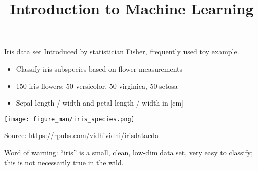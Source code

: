 \documentclass[11pt,compress,t,notes=noshow, xcolor=table]{beamer}
\title{Introduction to Machine Learning}
\begin{document}



\begin{vbframe}{Iris data set}
Introduced by statistician Fisher,  frequently used toy example.
\begin{itemize}
\item Classify iris subspecies based on flower measurements
\item 150 iris flowers: 50 versicolor, 50 virginica, 50 setosa
\item Sepal length / width and petal length / width in [cm]
\end{itemize}

\begin{center}
\texttt{[image: figure\_man/iris\_species.png]} 

\tiny
Source: \url{https://rpubs.com/vidhividhi/irisdataeda}
\normalsize
\end{center}

Word of warning: ``iris'' is a small, clean, low-dim data set,
 very easy to classify; this is not necessarily true in the wild. 

\end{vbframe}

\end{document}
